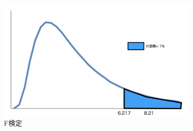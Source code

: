 \begin{figure}[phtb]
  \centering
  \includegraphics[width=10cm]{../pics/f.png}
  \caption{F検定}
  \label{fig:f}
\end{figure}

\newpage